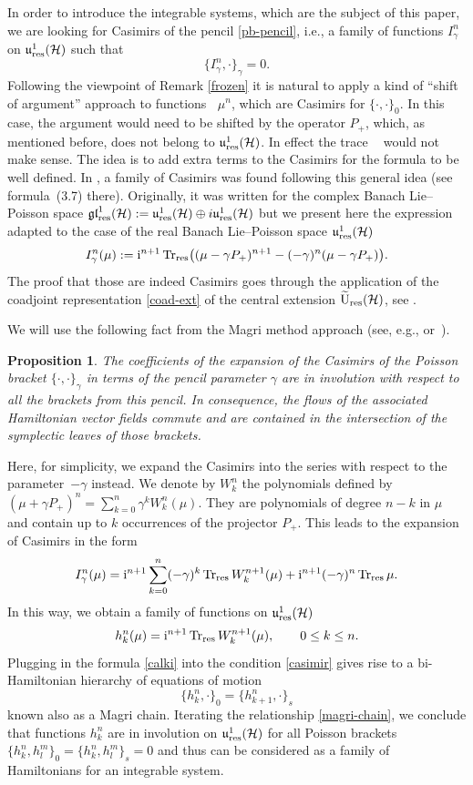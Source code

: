 \documentclass[10pt,a4paper]{amsart}
\newtheorem{prop}[thm]{Proposition}
\theoremstyle{definition}
\numberwithin{equation}{section}
\renewcommand{\H}{\mathcal{H}}
\newcommand{\Urt}{\widetilde{\mathrm{U}}_{\textnormal{res}}(\H)}
\newcommand{\urp}{\mathfrak u_{\textnormal{res}}^1(\H)}
\newcommand{\glrp}{\mathfrak{gl}^1_\textnormal{res}(\H)}
\DeclareMathOperator{\Trr}{Tr_{res}}
\newcommand{\pb}{\{\cdot,\cdot\}}
\newcommand{\be}{\begin{equation}}
\newcommand{\ee}{\end{equation}}
\begin{document}
In order to introduce the integrable systems, which are the subject of this paper, we are looking for Casimirs of the pencil \eqref{pb-pencil}, i.e., a family of functions $I_\gamma^n$ on $\urp$ such that
\be\label{casimir}
\{I^n_\gamma,\cdot\}_\gamma = 0.
\ee
Following the viewpoint of Remark \ref{frozen} it is natural to apply a kind of ``shift of argument'' approach to functions $\Trr\mu^n$, which are Casimirs for $\pb_0$. In this case, the argument would need to be shifted by the operator $P_+$, which, as mentioned before, does not belong to $\urp$. In effect the trace $\Trr$ would not make sense. The idea is to add extra terms to the Casimirs for the formula to be well defined. In \cite{GO-grass}, a family of Casimirs was found following this general idea (see formula~(3.7) there). Originally, it was written for the complex Banach Lie--Poisson space $\glrp := \urp \oplus i \urp$ but we present here the expression adapted to the case of the real Banach Lie--Poisson space $\urp$
\be \label{cas}I^n_\gamma(\mu):={\rm i}^{n+1}\Trr\bigl( (\mu-\gamma P_+)^{n+1}-(-\gamma)^{n}(\mu-\gamma P_+)\bigr).\ee
The proof that those are indeed Casimirs goes through the application of the coadjoint representation \eqref{coad-ext} of the central extension $\Urt$, see \cite[equation~(3.2)]{GO-grass}.

We will use the following fact from the Magri method approach (see, e.g., \cite{bols-bor,laurent-gengoux,magri} or~\cite[Appendix~B]{GO-grass}).
\begin{prop}
The coefficients of the expansion of the Casimirs of the Poisson bracket $\pb_\gamma$ in terms of the pencil parameter $\gamma$ are in involution with respect to all the brackets from this pencil. In consequence, the flows of the associated Hamiltonian vector fields commute and are contained in the intersection of the symplectic leaves of those brackets.
\end{prop}

Here, for simplicity, we expand the Casimirs into the series with respect to the parameter~$-\gamma$ instead. We denote by $W^n_k$ the polynomials defined by
$(\mu+\gamma P_+)^n=\sum_{k=0}^n\gamma^k W_k^n(\mu)$.
They are polynomials of degree $n-k$ in $\mu$ and contain up to $k$ occurrences of the projector $P_+$.
This leads to the expansion of Casimirs in the form
\be \label{W-expansion}I^n_\gamma(\mu)={\rm i}^{n+1}\sum_{k=0}^{n}(-\gamma)^k\Trr W_k^{n+1}(\mu)+{\rm i}^{n+1}(-\gamma)^{n}\Trr\mu.\ee
In this way, we obtain a family of functions on $\urp$
\be\label{calki}
h_k^n(\mu)={\rm i}^{n+1}\Trr W_k^{n+1}(\mu),\qquad 0\leq k\leq n.\ee
Plugging in the formula \eqref{calki} into the condition \eqref{casimir} gives rise to a bi-Hamiltonian hierarchy of equations of motion
\be \label{magri-chain}
\{h_k^n,\cdot\}_0=\{h_{k+1}^n,\cdot\}_s\ee
known also as a Magri chain.
Iterating the relationship \eqref{magri-chain}, we conclude that functions $h_k^n$
are in involution on $\urp$ for all Poisson brackets
$ \{h^n_k,h^m_l\}_0=\{h^n_k,h^m_l\}_s=0$
and thus can be considered as a family of Hamiltonians for an integrable system.
\end{document}
